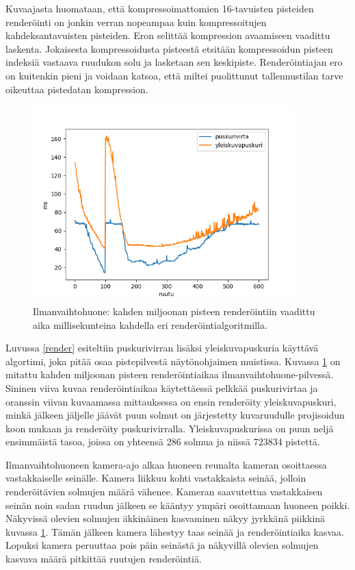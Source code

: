 Kuvaajasta huomataan, että kompressoimattomien 16-tavuisten pisteiden renderöinti on jonkin verran nopeampaa kuin kompressoitujen kahdeksantavuisten pisteiden. Eron selittää kompression avaamiseen vaadittu laskenta. Jokaisesta kompressoidusta pisteestä etsitään kompressoidun pisteen indeksiä vastaava ruudukon solu ja lasketaan sen keskipiste. Renderöintiajan ero on kuitenkin pieni ja voidaan katsoa, että miltei puolittunut tallennustilan tarve oikeuttaa pistedatan kompression.

\begin{figure}[h] 
    \centering
    \includegraphics[width=0.9\textwidth]{tuloksia/ilmanvaihtohuone_ms_per_frame.png}
    \caption{Ilmanvaihtohuone: kahden miljoonan pisteen renderöintiin vaadittu aika millisekunteina kahdella eri renderöintialgoritmilla.}
    \label{iv_ms}
\end{figure}

Luvussa \ref{render} esiteltiin puskurivirran lisäksi yleiskuvapuskuria käyttävä algortimi, joka pitää osaa pistepilvestä näytönohjaimen muistissa. Kuvassa \ref{iv_ms} on mitattu kahden miljoonan pisteen renderöintiaikaa ilmanvaihtohuone-pilvessä. Sininen viiva kuvaa renderöintiaikaa käytettäessä pelkkää puskurivirtaa ja oranssin viivan kuvaamassa mittauksessa on ensin renderöity yleiskuvapuskuri, minkä jälkeen jäljelle jäävät puun solmut on järjestetty kuvaruudulle projisoidun koon mukaan ja renderöity puskurivirralla. Yleiskuvapuskurissa on puun neljä ensimmäistä tasoa, joissa on yhteensä 286 solmua ja niissä 723834 pistettä.

Ilmanvaihtohuoneen kamera-ajo alkaa huoneen reunalta kameran osoittaessa vastakkaiselle seinälle. Kamera liikkuu kohti vastakkaista seinää, jolloin renderöitävien solmujen määrä vähenee. Kameran saavutettua vastakkaisen seinän noin sadan ruudun jälkeen se kääntyy ympäri osoittamaan huoneen poikki. Näkyvissä olevien solmujen äkkinäinen kasvaminen näkyy jyrkkänä piikkinä kuvassa \ref{iv_ms}. Tämän jälkeen kamera lähestyy taas seinää ja renderöintiaika kasvaa. Lopuksi kamera peruuttaa pois päin seinästä ja näkyvillä olevien solmujen kasvava määrä pitkittää ruutujen renderöintiä.

